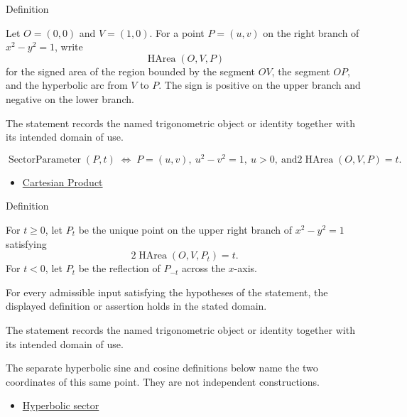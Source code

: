 \begin{definitionbox}{Definition}
\begin{definition}
\label{def:hyperbolic-sector}
Let $O=(0,0)$ and $V=(1,0)$. For a point $P=(u,v)$ on the right branch of
$x^2-y^2=1$, write
\[
  \operatorname{HArea}(O,V,P)
\]
for the signed area of the region bounded by the segment $OV$, the segment
$OP$, and the hyperbolic arc from $V$ to $P$. The sign is positive on the
upper branch and negative on the lower branch.
\end{definition}
\end{definitionbox}
\begin{remark*}[Interpretation]
The statement records the named trigonometric object or identity together with
its intended domain of use.
\end{remark*}

\begin{remark*}
\[
  \operatorname{SectorParameter}(P,t)
  \;\Longleftrightarrow\;
  P=(u,v),\ u^2-v^2=1,\ u>0,\ \text{and}
  2\operatorname{HArea}(O,V,P)=t.
\]
\end{remark*}
\begin{dependencies}
\begin{itemize}
  \item \hyperref[def:cartesian-product]{Cartesian Product}
\end{itemize}
\end{dependencies}

\begin{definitionbox}{Definition}
\begin{definition}
\label{def:swept-hyperbola-point}
For $t\geq 0$, let $P_t$ be the unique point on the upper right branch of
$x^2-y^2=1$ satisfying
\[
  2\operatorname{HArea}(O,V,P_t)=t.
\]
For $t<0$, let $P_t$ be the reflection of $P_{-t}$ across the $x$-axis.
\end{definition}
\end{definitionbox}
\begin{remark*}
For every admissible input satisfying the hypotheses of the statement, the
displayed definition or assertion holds in the stated domain.
\end{remark*}

\begin{remark*}[Interpretation]
The statement records the named trigonometric object or identity together with
its intended domain of use.
\end{remark*}

\begin{remark*}[Exposition]
The separate hyperbolic sine and cosine definitions below name the two
coordinates of this same point. They are not independent constructions.
\end{remark*}
\begin{dependencies}
\begin{itemize}
  \item \hyperref[def:hyperbolic-sector]{Hyperbolic sector}
\end{itemize}
\end{dependencies}
